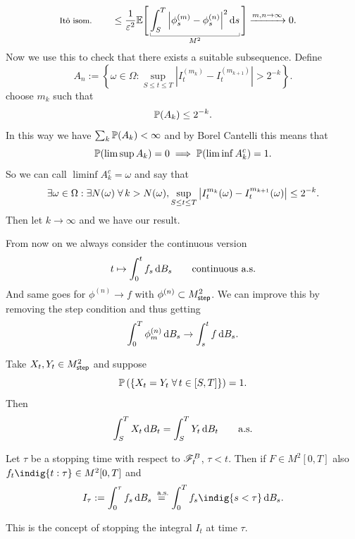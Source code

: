 \documentclass[12pt]{report}
\begin{document}
\begin{fancyproof}
\begin{align*}
		\text{\footnotesize \ito{} isom.}\qquad&\leq\frac{1}{\varepsilon^{2}}\evs\Bigg[\ubracketthin{\int_{S}^{T}\left|\phi^{(m)}_{s}-\phi^{(n)}_{s}\right|^{2}\ds}_{M^{2}}\Bigg]\xrightarrow{m,n\to\infty}0.
		\end{align*}
		Now we use this to check that there exists a suitable subsequence. Define
		\begin{equation*}
			A_{n}:=\left\{\omega\in\Omega:\sup_{S\leq t\leq T}\left|I^{(m_{k})}_{t}-I^{(m_{k+1})}_{t}\right|>2^{-k}\right\}.
		\end{equation*}
		choose $m_{k}$ such that 
		\begin{equation*}
			\mathbb{P}(A_{k})\leq 2^{-k}.
		\end{equation*}
		In this way we have $\sum_{k}\mathbb{P}(A_{k})<\infty$ and by Borel Cantelli this means that 
		\begin{equation*}
			\mathbb{P}(\limsup A_{k})=0\implies\mathbb{P}(\liminf A^{c}_{k})=1.
		\end{equation*}
		So we can call $\liminf A^{c}_{k}=\omega$ and say that 
		\begin{equation*}
			\exists\omega\in\Omega:\exists N(\omega)\;\forall\, k>N(\omega),\sup_{S\leq t\leq T}\left|I^{m_{k}}_{t}(\omega)-I^{m_{k+1}}_{t}(\omega)\right|\leq 2^{-k}.
		\end{equation*}
Then let $k\to\infty$ and we have our result.		
\end{fancyproof}
\begin{remark}
	From now on we always consider the continuous version
	\begin{equation*}
		t\mapsto\int_{0}^{t}f_{s}\mathop{}\!\mathrm{d} B_{s}\qquad\text{continuous a.s.}
	\end{equation*}
	And same goes for $\phi^{(n)}\to f$ with $\phi^{(n)}\subset M^{2}_{\mathsf{step}}$. We can improve this by removing the step condition and thus getting
	\begin{equation*}
		\int_{0}^{T}\phi^{(n)}_{m}\mathop{}\!\mathrm{d} B_{s}\to\int_{s}^{t}f\mathop{}\!\mathrm{d} B_{s}.
	\end{equation*}
\end{remark}
\begin{theorem}
	Take $X_{t}, Y_{t}\in M^{2}_{\mathsf{step}}$ and suppose 
	\begin{equation*}
		\mathbb{P}\left(\left\{X_{t}=Y_{t}\;\forall\, t\in[S,T]\right\}\right)=1.
	\end{equation*}
	Then
	\begin{equation*}
		\int_{S}^{T}X_{t}\mathop{}\!\mathrm{d} B_{t}=\int_{S}^{T}Y_{t}\mathop{}\!\mathrm{d} B_{t}\qquad\text{a.s.}
	\end{equation*}
\end{theorem}
\begin{theorem}
	Let $\tau$ be a stopping time with respect to $\mathscr{F}^{B}_{t}$, $\tau<t$. Then if $F\in M^{2}[0,T]$ also $f_{t}\indig{t:\tau}\in M^{2}[0,T]$ and
	\begin{equation*}
		I_{\tau}:=\int_{0}^{\tau}f_{s}\dbs\stackrel{\as{}}{=}\int_{0}^{T}f_{s}\indig{s<\tau}\dbs.
	\end{equation*}
\end{theorem}
This is the concept of stopping the integral $I_{t}$ at time $\tau$.
\end{document}
